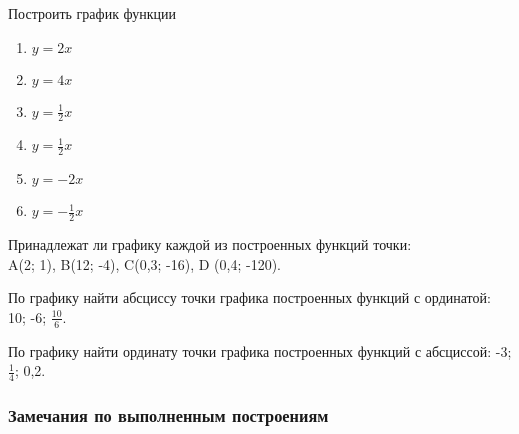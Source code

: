 \documentclass[algebra,twocolumn]{pum}
\begin{document}
  \begin{exercises}
    \begin{question}
      Построить график функции
      \begin{multicols}{3}
        \begin{enumerate}[label=\arabic*)]
        \item $y=2x$ 
        \item $y=4x$ 
        \item $y=\frac{1}{2}x$ 
        \item $y=\frac{1}{2}x$ 
        \item $y=-2x$ 
        \item $y=-\frac{1}{2}x$ 
      \end{enumerate}
    \end{multicols}
  \end{question}
  \begin{question}
    Принадлежат ли графику каждой из построенных функций точки:\\
    A(2; 1), B(12; -4), C(0,3; -16), D (0,4; -120).
  \end{question}
  \begin{question}
    По графику найти абсциссу точки графика построенных функций с ординатой: 10; -6; $\frac{10}{6}$.
  \end{question}
  \begin{question}
    По графику найти ординату точки графика построенных функций с абсциссой: -3; $\frac{1}{4}$; 0,2.
  \end{question}
\end{exercises}

\subsubsection*{Замечания по выполненным построениям}
\end{document}
